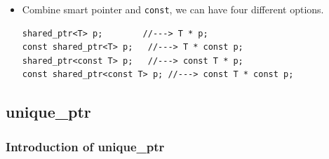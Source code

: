 \documentclass[a4paper,11pt,twoside]{book}
\begin{document}
\begin{itemize}
\item Combine smart pointer and \texttt{const}, we can have four different options.
\begin{lstlisting}[numbers = none]
shared_ptr<T> p;        //---> T * p;
const shared_ptr<T> p;   //---> T * const p;
shared_ptr<const T> p;   //---> const T * p;
const shared_ptr<const T> p; //---> const T * const p;
\end{lstlisting}

\end{itemize}

\subsection{unique\_ptr}

\subsubsection{Introduction of unique\_ptr}
\end{document}
